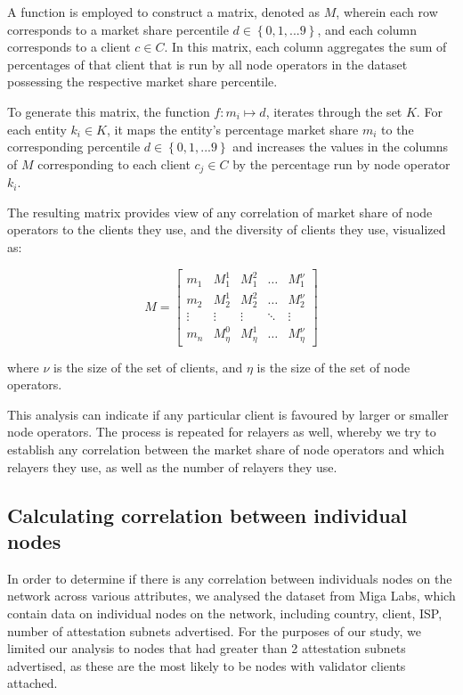 \documentclass[conference]{IEEEtran}
\begin{document}
A function is employed to construct a matrix, denoted as $M$, wherein each row corresponds to a market share percentile $d \in \left\{0, 1, ... 9\right\}$, and each column corresponds to a client $c \in C$. In this matrix, each column aggregates the sum of percentages of that client that is run by all node operators in the dataset possessing the respective market share percentile.

To generate this matrix, the function $f: m_i \mapsto d$, iterates through the set $K$. For each entity $k_i \in K$, it maps the entity's percentage market share $m_i$ to the corresponding percentile $d \in \left\{0, 1, ... 9\right\}$ and increases the values in the columns of $M$ corresponding to each client $c_j \in C$ by the percentage run by node operator $k_i$.

The resulting matrix provides view of any correlation of market share of node operators to the clients they use, and the diversity of clients they use, visualized as:

\[
M = \begin{bmatrix}
m_1 & M_1^1 & M_1^2 & \ldots & M_1^{\nu} \\
m_2 & M_2^1 & M_2^2 & \ldots & M_2^{\nu} \\
\vdots & \vdots & \vdots & \ddots & \vdots \\
m_n & M_{\eta}^0 & M_{\eta}^1 & \ldots & M_{\eta}^{\nu}
\end{bmatrix}
\]

where $\nu$ is the size of the set of clients, and $\eta$ is the size of the set of node operators.

This analysis can indicate if any particular client is favoured by larger or smaller node operators. The process is repeated for relayers as well, whereby we try to establish any correlation between the market share of node operators and which relayers they use, as well as the number of relayers they use.

\subsection{Calculating correlation between individual nodes}

In order to determine if there is any correlation between individuals nodes on the network across various attributes, we analysed the dataset from Miga Labs, which contain data on individual nodes on the network, including country, client, ISP, number of attestation subnets advertised. For the purposes of our study, we limited our analysis to nodes that had greater than 2 attestation subnets advertised, as these are the most likely to be nodes with validator clients attached.
\end{document}
